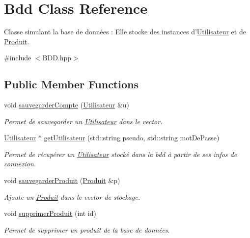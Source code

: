 \hypertarget{classBdd}{\section{Bdd Class Reference}
\label{classBdd}
}


Classe simulant la base de données \-: Elle stocke des instances d'\hyperlink{classUtilisateur}{Utilisateur} et de \hyperlink{classProduit}{Produit}.  




{\ttfamily \#include $<$B\-D\-D.\-hpp$>$}

\subsection*{Public Member Functions}
\begin{DoxyCompactItemize}
\item 
void \hyperlink{classBdd_af59ec2bf0e35d5698b0fcb86baf9654c}{sauvegarder\-Compte} (\hyperlink{classUtilisateur}{Utilisateur} \&u)
\begin{DoxyCompactList}\small\item\em Permet de sauvegarder un \hyperlink{classUtilisateur}{Utilisateur} dans le vector. \end{DoxyCompactList}\item 
\hyperlink{classUtilisateur}{Utilisateur} $\ast$ \hyperlink{classBdd_ad69c2c6cbe4acb3e120cb7266c89066a}{get\-Utilisateur} (std\-::string pseudo, std\-::string mot\-De\-Passe)
\begin{DoxyCompactList}\small\item\em Permet de récupérer un \hyperlink{classUtilisateur}{Utilisateur} stocké dans la bdd à partir de ses infos de connexion. \end{DoxyCompactList}\item 
void \hyperlink{classBdd_a6ff827126b062278117c109948e38975}{sauvegarder\-Produit} (\hyperlink{classProduit}{Produit} \&p)
\begin{DoxyCompactList}\small\item\em Ajoute un \hyperlink{classProduit}{Produit} dans le vector de stockage. \end{DoxyCompactList}\item 
void \hyperlink{classBdd_aa6600392d2cd0784b86e49cc27ca8d81}{supprimer\-Produit} (int id)
\begin{DoxyCompactList}\small\item\em Permet de supprimer un produit de la base de données. \end{DoxyCompactList}\item 

\end{DoxyCompactItemize}
